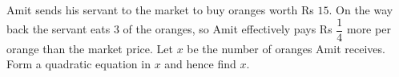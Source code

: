 Amit sends his servant to the market to buy oranges worth Rs $15$. On the way back the servant eats $3$ of the oranges, so Amit effectively pays Rs $\dfrac{1}{4}$ more per orange than the market price. Let $x$ be the number of oranges Amit receives. Form a quadratic equation in $x$ and hence find $x$.
